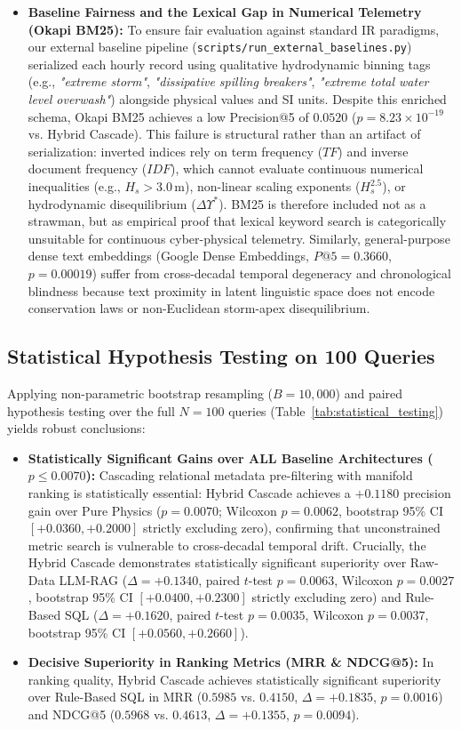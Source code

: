 \documentclass[journal]{IEEEtran}
\begin{document}
\begin{itemize}
    \item \textbf{Baseline Fairness and the Lexical Gap in Numerical Telemetry (Okapi BM25):} To ensure fair evaluation against standard IR paradigms, our external baseline pipeline (\texttt{scripts/run\_external\_baselines.py}) serialized each hourly record using qualitative hydrodynamic binning tags (e.g., \textit{"extreme storm"}, \textit{"dissipative spilling breakers"}, \textit{"extreme total water level overwash"}) alongside physical values and SI units. Despite this enriched schema, Okapi BM25 achieves a low Precision@5 of $0.0520$ ($p = 8.23 \times 10^{-19}$ vs. Hybrid Cascade). This failure is structural rather than an artifact of serialization: inverted indices rely on term frequency ($TF$) and inverse document frequency ($IDF$), which cannot evaluate continuous numerical inequalities (e.g., $H_s > 3.0\,\text{m}$), non-linear scaling exponents ($H_s^{2.5}$), or hydrodynamic disequilibrium ($\Delta\Upsilon^*$). BM25 is therefore included not as a strawman, but as empirical proof that lexical keyword search is categorically unsuitable for continuous cyber-physical telemetry. Similarly, general-purpose dense text embeddings (Google Dense Embeddings, $P@5 = 0.3660$, $p = 0.00019$) suffer from cross-decadal temporal degeneracy and chronological blindness because text proximity in latent linguistic space does not encode conservation laws or non-Euclidean storm-apex disequilibrium.
\end{itemize}

\subsection{Statistical Hypothesis Testing on 100 Queries}
Applying non-parametric bootstrap resampling ($B = 10{,}000$) and paired hypothesis testing over the full $N = 100$ queries (Table~\ref{tab:statistical_testing}) yields robust conclusions:
\begin{itemize}
    \item \textbf{Statistically Significant Gains over ALL Baseline Architectures ($p \le 0.0070$):} Cascading relational metadata pre-filtering with manifold ranking is statistically essential: Hybrid Cascade achieves a $+0.1180$ precision gain over Pure Physics ($p = 0.0070$; Wilcoxon $p = 0.0062$, bootstrap 95\% CI $[+0.0360, +0.2000]$ strictly excluding zero), confirming that unconstrained metric search is vulnerable to cross-decadal temporal drift. Crucially, the Hybrid Cascade demonstrates statistically significant superiority over Raw-Data LLM-RAG ($\Delta = +0.1340$, paired $t$-test $p = 0.0063$, Wilcoxon $p = 0.0027$, bootstrap 95\% CI $[+0.0400, +0.2300]$ strictly excluding zero) and Rule-Based SQL ($\Delta = +0.1620$, paired $t$-test $p = 0.0035$, Wilcoxon $p = 0.0037$, bootstrap 95\% CI $[+0.0560, +0.2660]$).
    \item \textbf{Decisive Superiority in Ranking Metrics (MRR \& NDCG@5):} In ranking quality, Hybrid Cascade achieves statistically significant superiority over Rule-Based SQL in MRR ($0.5985$ vs. $0.4150$, $\Delta = +0.1835$, $p = 0.0016$) and NDCG@5 ($0.5968$ vs. $0.4613$, $\Delta = +0.1355$, $p = 0.0094$).
\end{itemize}
\end{document}
